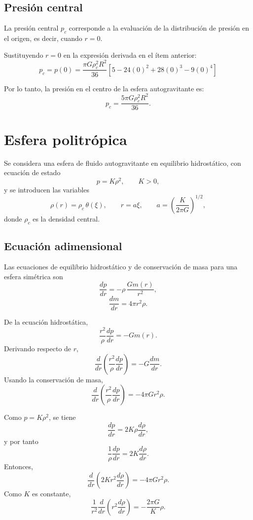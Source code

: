 \documentclass[11pt,a4paper]{article}
\begin{document}
\subsection{Presión central}

La presión central $p_c$ corresponde a la evaluación de la distribución de presión en el origen, es decir, cuando $r = 0$. 

Sustituyendo $r = 0$ en la expresión derivada en el ítem anterior:
\[
p_c = p(0) = \frac{\pi G \rho_c^2 R^2}{36} \left[ 5 - 24(0)^2 + 28(0)^3 - 9(0)^4 \right]
\]

Por lo tanto, la presión en el centro de la esfera autogravitante es:
\[
\boxed{p_c = \frac{5\pi G \rho_c^2 R^2}{36}}.
\]

\clearpage

\section{Esfera politrópica}

Se considera una esfera de fluido autogravitante en equilibrio hidrostático, con ecuación de estado
\[
p=K\rho^{2}, \qquad K>0,
\]
y se introducen las variables
\[
\rho(r)=\rho_c\,\theta(\xi), \qquad r=a\xi, \qquad 
a=\left(\frac{K}{2\pi G}\right)^{1/2},
\]
donde $\rho_c$ es la densidad central.

\subsection{Ecuación adimensional}

Las ecuaciones de equilibrio hidrostático y de conservación de masa para una esfera simétrica son
\[
\frac{dp}{dr}=-\rho\,\frac{Gm(r)}{r^{2}},
\]
\[
\frac{dm}{dr}=4\pi r^{2}\rho .
\]

De la ecuación hidrostática,
\[
\frac{r^{2}}{\rho}\frac{dp}{dr}=-Gm(r).
\]
Derivando respecto de $r$,
\[
\frac{d}{dr}\left(\frac{r^{2}}{\rho}\frac{dp}{dr}\right)
=-G\frac{dm}{dr}.
\]
Usando la conservación de masa,
\[
\frac{d}{dr}\left(\frac{r^{2}}{\rho}\frac{dp}{dr}\right)
=-4\pi G r^{2}\rho .
\]

Como $p=K\rho^{2}$, se tiene
\[
\frac{dp}{dr}=2K\rho\frac{d\rho}{dr},
\]
y por tanto
\[
\frac{1}{\rho}\frac{dp}{dr}=2K\frac{d\rho}{dr}.
\]
Entonces,
\[
\frac{d}{dr}\left(2K r^{2}\frac{d\rho}{dr}\right)
=-4\pi G r^{2}\rho .
\]
Como $K$ es constante,
\[
\frac{1}{r^{2}}\frac{d}{dr}\left(r^{2}\frac{d\rho}{dr}\right)
=-\frac{2\pi G}{K}\rho .
\]
\end{document}
